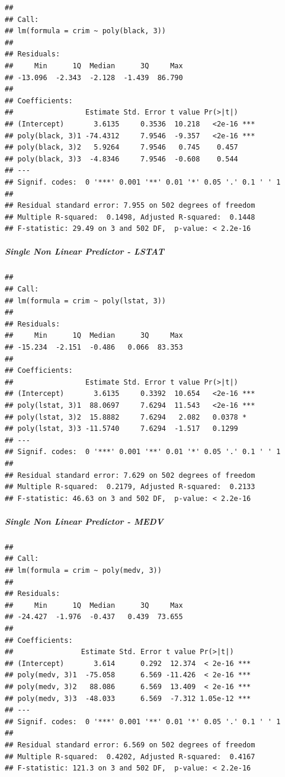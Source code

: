 \documentclass[
]{article}
\begin{document}
\begin{verbatim}
## 
## Call:
## lm(formula = crim ~ poly(black, 3))
## 
## Residuals:
##     Min      1Q  Median      3Q     Max 
## -13.096  -2.343  -2.128  -1.439  86.790 
## 
## Coefficients:
##                 Estimate Std. Error t value Pr(>|t|)    
## (Intercept)       3.6135     0.3536  10.218   <2e-16 ***
## poly(black, 3)1 -74.4312     7.9546  -9.357   <2e-16 ***
## poly(black, 3)2   5.9264     7.9546   0.745    0.457    
## poly(black, 3)3  -4.8346     7.9546  -0.608    0.544    
## ---
## Signif. codes:  0 '***' 0.001 '**' 0.01 '*' 0.05 '.' 0.1 ' ' 1
## 
## Residual standard error: 7.955 on 502 degrees of freedom
## Multiple R-squared:  0.1498, Adjusted R-squared:  0.1448 
## F-statistic: 29.49 on 3 and 502 DF,  p-value: < 2.2e-16
\end{verbatim}

\hypertarget{single-non-linear-predictor---lstat}{%
\subparagraph{\texorpdfstring{\textbf{Single Non Linear Predictor -
LSTAT}}{Single Non Linear Predictor - LSTAT}}\label{single-non-linear-predictor---lstat}}

\begin{verbatim}
## 
## Call:
## lm(formula = crim ~ poly(lstat, 3))
## 
## Residuals:
##     Min      1Q  Median      3Q     Max 
## -15.234  -2.151  -0.486   0.066  83.353 
## 
## Coefficients:
##                 Estimate Std. Error t value Pr(>|t|)    
## (Intercept)       3.6135     0.3392  10.654   <2e-16 ***
## poly(lstat, 3)1  88.0697     7.6294  11.543   <2e-16 ***
## poly(lstat, 3)2  15.8882     7.6294   2.082   0.0378 *  
## poly(lstat, 3)3 -11.5740     7.6294  -1.517   0.1299    
## ---
## Signif. codes:  0 '***' 0.001 '**' 0.01 '*' 0.05 '.' 0.1 ' ' 1
## 
## Residual standard error: 7.629 on 502 degrees of freedom
## Multiple R-squared:  0.2179, Adjusted R-squared:  0.2133 
## F-statistic: 46.63 on 3 and 502 DF,  p-value: < 2.2e-16
\end{verbatim}

\hypertarget{single-non-linear-predictor---medv}{%
\subparagraph{\texorpdfstring{\textbf{Single Non Linear Predictor -
MEDV}}{Single Non Linear Predictor - MEDV}}\label{single-non-linear-predictor---medv}}

\begin{verbatim}
## 
## Call:
## lm(formula = crim ~ poly(medv, 3))
## 
## Residuals:
##     Min      1Q  Median      3Q     Max 
## -24.427  -1.976  -0.437   0.439  73.655 
## 
## Coefficients:
##                Estimate Std. Error t value Pr(>|t|)    
## (Intercept)       3.614      0.292  12.374  < 2e-16 ***
## poly(medv, 3)1  -75.058      6.569 -11.426  < 2e-16 ***
## poly(medv, 3)2   88.086      6.569  13.409  < 2e-16 ***
## poly(medv, 3)3  -48.033      6.569  -7.312 1.05e-12 ***
## ---
## Signif. codes:  0 '***' 0.001 '**' 0.01 '*' 0.05 '.' 0.1 ' ' 1
## 
## Residual standard error: 6.569 on 502 degrees of freedom
## Multiple R-squared:  0.4202, Adjusted R-squared:  0.4167 
## F-statistic: 121.3 on 3 and 502 DF,  p-value: < 2.2e-16
\end{verbatim}
\end{document}
